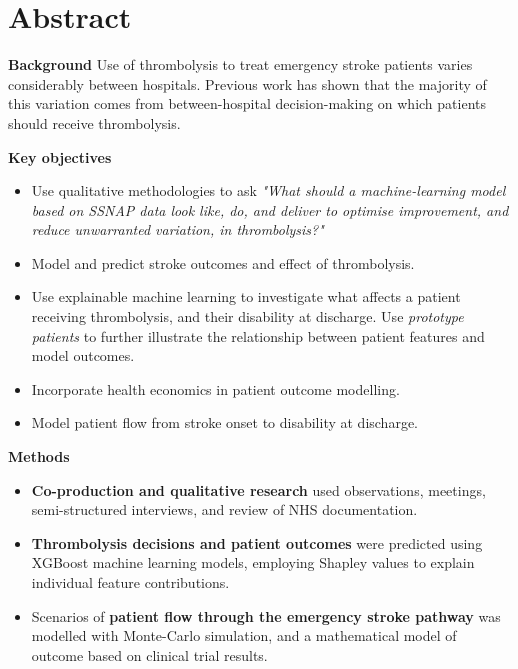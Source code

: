 \section*{Abstract} %

\textbf{Background}
Use of thrombolysis to treat emergency stroke patients varies considerably between hospitals. Previous work has shown that the majority of this variation comes from between-hospital decision-making on which patients should receive thrombolysis.

\textbf{Key objectives} %

\begin{itemize}

    \item Use qualitative methodologies to ask \textit{"What should a machine-learning model based on SSNAP data look like, do, and deliver to optimise improvement, and reduce unwarranted variation, in thrombolysis?"}

    \item Model and predict stroke outcomes and effect of thrombolysis.

    \item Use explainable machine learning to investigate what affects a patient receiving thrombolysis, and their disability at discharge. Use \textit{prototype patients} to further illustrate the relationship between patient features and model outcomes.
    
    \item Incorporate health economics in patient outcome modelling.

    \item Model patient flow from stroke onset to disability at discharge. 

\end{itemize}


\textbf{Methods}

\begin{itemize}

    \item \textbf{Co-production and qualitative research} used observations, meetings, semi-structured interviews, and review of NHS documentation.

    \item \textbf{Thrombolysis decisions and patient outcomes} were predicted using XGBoost machine learning models, employing Shapley values to explain individual feature contributions.

    \item Scenarios of \textbf{patient flow through the emergency stroke pathway} was modelled with Monte-Carlo simulation, and a mathematical model of outcome based on clinical trial results.
    
\end{itemize}

